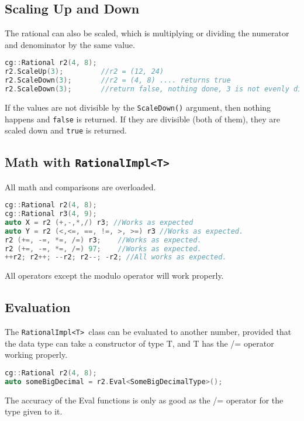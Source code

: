 \documentclass{article}
\newcommand{\theobj}{\protect\Verb+RationalImpl<T> +}
\begin{document}
\subsection{Scaling Up and Down}

The rational can also be scaled, which is multiplying or dividing the numerator and denominator by the same value.


\begin{lstlisting}[language=C++, label=code:1, caption=Creating organized rationals with \theobj]
cg::Rational r2(4, 8);
r2.ScaleUp(3);         //r2 = (12, 24)
r2.ScaleDown(3);       //r2 = (4, 8) .... returns true
r2.ScaleDown(3);       //return false, nothing done, 3 is not evenly divisable by the numerator and denominator.
\end{lstlisting}
If the values are not divisible by the \Verb+ScaleDown()+ argument, then nothing happens and \Verb+false+ is returned. If they are divisible (both of them), they are scaled down and \Verb+true+ is returned.

\subsection{Math with \theobj}

All math and comparisons are overloaded.

\begin{lstlisting}[language=C++, label=code:1, caption=Creating organized rationals with \theobj]
cg::Rational r2(4, 8);
cg::Rational r3(4, 9);
auto X = r2 (+,-,*,/) r3; //Works as expected
auto Y = r2 (<,<=, ==, !=, >, >=) r3 //Works as expected.
r2 (+=, -=, *=, /=) r3;    //Works as expected.
r2 (+=, -=, *=, /=) 97;    //Works as expected.
++r2; r2++; --r2; r2--; -r2; //All works as expected.
\end{lstlisting}

All operators except the modulo operator will work properly.

\subsection{Evaluation}

The \theobj class can be evaluated to another number, provided that the data type can take a constructor of type T, and T has the /= operator working properly.


\begin{lstlisting}[language=C++, label=code:1, caption=Creating organized rationals with \theobj]
cg::Rational r2(4, 8);
auto someBigDecimal = r2.Eval<SomeBigDecimalType>();
\end{lstlisting}

The accuracy of the Eval functions is only as good as the /= operator for the type given to it.
\end{document}
